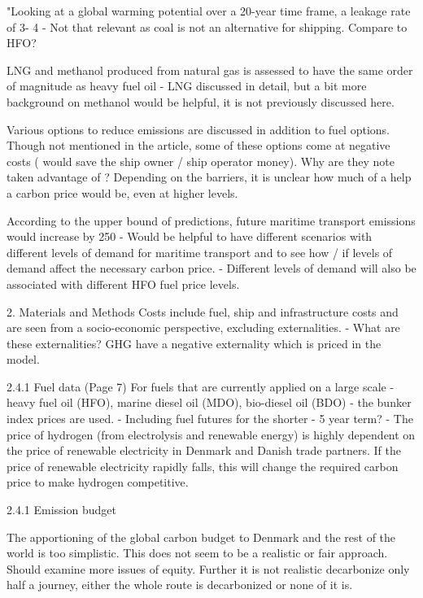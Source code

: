 "Looking at a global warming potential over a 20-year time frame, a leakage rate of 3- 4 %
-	Not that relevant as coal is not an alternative for shipping. Compare to HFO? 

LNG and methanol produced from natural gas is assessed to have the same order of magnitude as heavy fuel oil
-	LNG discussed in detail, but a bit more background on methanol would be helpful, it is not previously discussed here. 

Various options to reduce emissions are discussed in addition to fuel options. Though not mentioned in the article, some of these options come at negative costs ( would save the ship owner / ship operator money). Why are they note taken advantage of ? Depending on the barriers, it is unclear how much of a help a carbon price would be, even at higher levels.
 
According to the upper bound of predictions, future maritime transport emissions would increase by 250%
-	Would be helpful to have different scenarios with different levels of demand for maritime transport and to see how / if levels of demand affect the necessary carbon price. 
-	Different levels of demand will also be associated with different HFO fuel price levels. 

2. Materials and Methods
Costs include fuel, ship and infrastructure costs and are seen from a socio-economic perspective, excluding externalities. 
-       What are these externalities? GHG have a negative externality which is priced in the model. 

2.4.1 Fuel data (Page 7)
For fuels that are currently applied on a large scale - heavy fuel oil (HFO), marine diesel oil (MDO), bio-diesel oil (BDO) - the bunker index prices are used.
-	Including fuel futures for the shorter - 5 year term? 
-	The price of hydrogen (from electrolysis and renewable energy) is highly dependent on the price of renewable electricity in Denmark and Danish trade partners. If the price of renewable electricity rapidly falls, this will change the required carbon price to make hydrogen competitive. 

2.4.1 Emission budget

The apportioning of the global carbon budget to Denmark and the rest of the world is too simplistic. This does not seem to be a realistic or fair approach. Should examine more issues of equity. Further it is not realistic decarbonize only half a journey, either the whole route is decarbonized or none of it is. 

